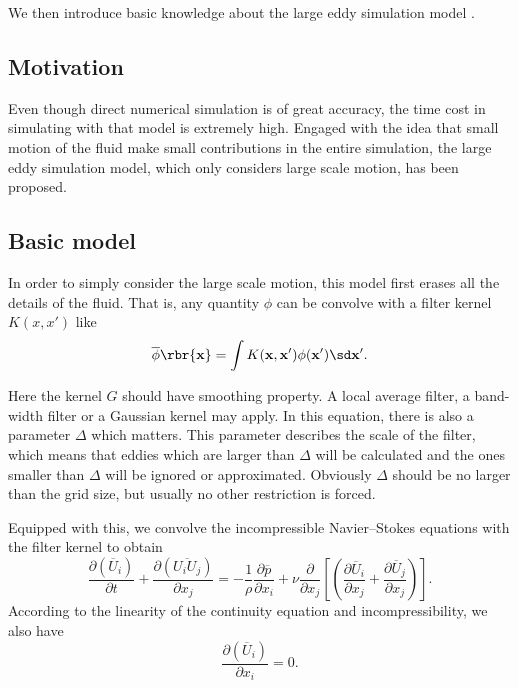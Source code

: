 \documentclass[english, nochinese]{pkupaper}
\begin{document}
We then introduce basic knowledge about the large eddy simulation model \parencite{pope_turbulent_2001} \parencite{ferziger_computational_2002}.

\subsection{Motivation}

Even though direct numerical simulation is of great accuracy, the time cost in simulating with that model is extremely high. Engaged with the idea that small motion of the fluid make small contributions in the entire simulation, the large eddy simulation model, which only considers large scale motion, has been proposed.

\subsection{Basic model}

In order to simply consider the large scale motion, this model first erases all the details of the fluid. That is, any quantity $\phi$ can be convolve with a filter kernel $K(x, x')$ like %
\begin{equation}\label{Eq:Conv}
\overline{\phi} \rbr{\mathbf{x}} = \int K(\mathbf{x}, \mathbf{x}') \phi(\mathbf{x}')\sd \mathbf{x}'.
\end{equation}

Here the kernel $G$ should have smoothing property. A local average filter, a band-width filter or a Gaussian kernel may apply. In this equation, there is also a parameter $\Delta$ which matters. This parameter describes the scale of the filter, which means that eddies which are larger than $\Delta$ will be calculated and the ones smaller than $\Delta$ will be ignored or approximated. Obviously $\Delta$ should be no larger than the grid size, but usually no other restriction is forced.

Equipped with this, we convolve the incompressible Navier--Stokes equations with the filter kernel to obtain%
\begin{equation}\label{Eq:ConvKe}
\frac{\partial(\overline{U}_i)}{\partial t} + \frac{\partial(\overline{U_iU_j})}{\partial x_j} = -\frac{1}{\rho} \frac{\partial\overline{p}}{\partial x_i} +\nu \frac{\partial}{\partial x_j}\left[\left(\frac{\partial\overline{U}_i}{\partial x_j}+\frac{\partial\overline{U}_j}{\partial x_j}\right)\right].
\end{equation}
According to the linearity of the continuity equation and incompressibility, we also have
\begin{equation}
\frac{\partial(\overline{U}_i)}{\partial x_i} = 0.
\end{equation}
\end{document}
